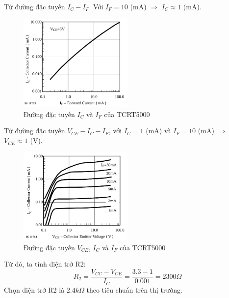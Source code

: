             \hspace*{0.6cm}Từ đường đặc tuyến $I_{C} - I_{F}$. Với $I_{F} = 10$ (mA) $\Rightarrow$ $I_{C} \approx 1$ (mA).
            \begin{figure}[H]
                \centering
                \includegraphics[width=0.5\textwidth]{pictures/chapter4/c4_p4_IC&IF.png}
                \caption{Đường đặc tuyến $I_{C}$ và $I_{F}$ của TCRT5000}
                \label{fig:4-6}
            \end{figure}
            Từ đường đặc tuyến $V_{CE} - I_{C} - I_{F}$, với $I_{C} = 1$ (mA) và $I_{F} = 10$ (mA) $\Rightarrow$ $V_{CE} \approx 1$ (V).\\
            \begin{figure}[H]
                \centering
                \includegraphics[width=0.5\textwidth]{pictures/chapter4/c4_p5_VCE&IC&IF.png}
                \caption{Đường đặc tuyến $V_{CE}$, $I_{C}$ và $I_{F}$ của TCRT5000}
                \label{fig:4-7}
            \end{figure}
            Từ đó, ta tính điện trở R2:
            \begin{equation}
                R_{2} = \frac{V_{CC} - V_{CE}}{I_{C}} = \frac{3.3 - 1}{0.001} = 2300 \Omega
                \label{eq:4-2}
            \end{equation}
            \hspace*{0.6cm}Chọn điện trở R2 là $2.4 k\Omega$ theo tiêu chuẩn trên thị trường.
